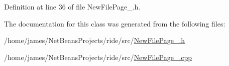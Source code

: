 Definition at line 36 of file New\-File\-Page\-\_.\-h.



The documentation for this class was generated from the following files\-:\begin{DoxyCompactItemize}
\item 
/home/james/\-Net\-Beans\-Projects/ride/src/\hyperlink{_new_file_page__1_8h}{New\-File\-Page\-\_.\-h}\item 
/home/james/\-Net\-Beans\-Projects/ride/src/\hyperlink{_new_file_page__1_8cpp}{New\-File\-Page\-\_.\-cpp}\end{DoxyCompactItemize}

